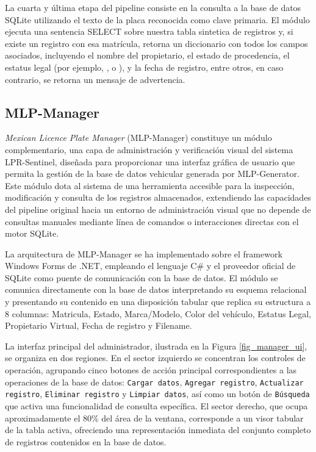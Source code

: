La cuarta y última etapa del pipeline consiste en la consulta a la base de datos SQLite utilizando el texto de la placa reconocida como clave primaria. El módulo ejecuta una sentencia SELECT sobre nuestra tabla sintetica de registros y, si existe un registro con esa matrícula, retorna un diccionario con todos los campos asociados, incluyendo el nombre del propietario, el estado de procedencia, el estatus legal (por ejemplo, ,  o ), y la fecha de registro, entre otros, en caso contrario, se retorna un mensaje de advertencia.

\subsection*{MLP-Manager}
\textit{Mexican Licence Plate Manager} (MLP-Manager) constituye un módulo complementario, una capa de administración y verificación visual del sistema LPR-Sentinel, diseñada para proporcionar una interfaz gráfica de usuario que permita la gestión de la base de datos vehicular generada por MLP-Generator. Este módulo dota al sistema de una herramienta accesible para la inspección, modificación y consulta de los registros almacenados, extendiendo las capacidades del pipeline original hacia un entorno de administración visual que no depende de consultas manuales mediante línea de comandos o interacciones directas con el motor SQLite.

La arquitectura de MLP-Manager se ha implementado sobre el framework Windows Forms de .NET, empleando el lenguaje C\# y el proveedor oficial de SQLite como puente de comunicación con la base de datos. El módulo se comunica directamente con la base de datos interpretando su esquema relacional y presentando su contenido en una disposición tabular que replica su estructura a 8 columnas: Matricula, Estado, Marca/Modelo, Color del vehículo, Estatus Legal, Propietario Virtual, Fecha de registro y Filename.

La interfaz principal del administrador, ilustrada en la Figura \ref{fig_manager_ui}, se organiza en dos regiones. En el sector izquierdo se concentran los controles de operación, agrupando cinco botones de acción principal correspondientes a las operaciones de la base de datos: \texttt{Cargar datos}, \texttt{Agregar registro}, \texttt{Actualizar registro}, \texttt{Eliminar registro} y \texttt{Limpiar datos}, así como un botón de \texttt{Búsqueda} que activa una funcionalidad de consulta específica. El sector derecho, que ocupa aproximadamente el 80\% del área de la ventana, corresponde a un visor tabular de la tabla activa, ofreciendo una representación inmediata del conjunto completo de registros contenidos en la base de datos.

